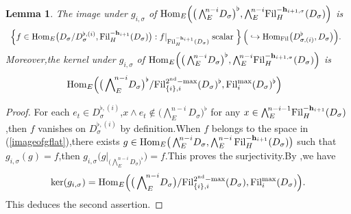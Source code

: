 \documentclass[10pt]{article}
\newtheorem{lem}[thm]{Lemma}
\newcommand{\fil}{{\rm Fil}}
\newcommand{\homo}{{\rm Hom}}
\newcommand{\bh}{{\mathbf{h}}}
\begin{document}
\begin{lem}\label{lemforwedge} 
	The image under $g_{i,\sigma}$ of $\homo_E\Big(\big(\bigwedge_{E}^{\!n-i}\!D_{\sigma}\big)^{\flat},\bigwedge\nolimits_E^{\!n-i}\!\fil_H^{-\bh_{i+1,\sigma}}(D_{\sigma})\Big)$ is 
	\begin{equation}\label{imageofgflat}
		\begin{aligned}
			&\;\left\{f\in\homo_E\big(D_{\sigma}/D_{\sigma}^{\flat,(i)},\fil_H^{-\bh_{i+1}}(D_{\sigma})\big):f|_{\fil_H^{-\bh_{i+1}}(D_{\sigma})} \text{\;scalar\;}\right\} \Big(\hookrightarrow \homo_{\fil}\big(D_{\sigma,(i)}^{\flat},D_{\sigma}\big)\Big).
		\end{aligned}
	\end{equation}
Moreover,\;the kernel under $g_{i,\sigma}$ of $\homo_E\Big(\big(\bigwedge_{E}^{\!n-i}\!D_{\sigma}\big)^{\flat},\bigwedge\nolimits_E^{\!n-i}\!\fil_H^{-\bh_{i+1,\sigma}}(D_{\sigma})\Big)$ is 
\begin{equation}
	\begin{aligned}
		&\;\homo_E\Big(\big(\bigwedge\nolimits_{E}^{\!n-i}\!D_{\sigma}\big)^{\flat}/\fil_{\{i\},i}^{2^{\mathrm{nd}}-\max}(D_{\sigma})^{\flat},\fil_i^{\max}(D_{\sigma})^{\flat}\Big)
	\end{aligned}
\end{equation}
\end{lem}
\begin{proof}For each $e_t\in D_{\sigma}^{\flat,(i)}$,\;$x\wedge e_t\notin \big(\bigwedge\nolimits_{E}^{\!n-i}\!D_{\sigma}\big)^{\flat}$ for any $x\in \bigwedge\nolimits_E^{\!n-i-1}\!\fil_H^{-\bh_{i+1}}(D_{\sigma})$,\;then $f$ vanishes on $D_{\sigma}^{\flat,(i)}$ by definition.\;When $f$ belongs to the space in (\ref{imageofgflat}),\;there exists $g\in \homo_E\big(\bigwedge\nolimits_E^{\!n-i}\!D_{\sigma},\bigwedge_E^{n-i}\fil_H^{-\bh_{i+1}}(D_{\sigma})\big)$ such that $g_{i,\sigma}(g)=f$,\;then   $g_{i,\sigma}\big(g|_{\big(\bigwedge\nolimits_{E}^{\!n-i}\!D_{\sigma}\big)^{\flat}}\big)=f$.\;This proves the surjectivity.\;By \cite[Remark 2.3.6,\;(ii)]{BDcritical25},\;we have
\[\ker(g_{i,\sigma})= \homo_E\Big(\big(\bigwedge\nolimits_{E}^{\!n-i}\!D_{\sigma}\big)/\fil_{\{i\},i}^{2^{\mathrm{nd}}-\max}(D_{\sigma}),\fil_i^{\max}(D_{\sigma})\Big).\]
This deduces the second assertion.\;
\end{proof}	
\end{document}
